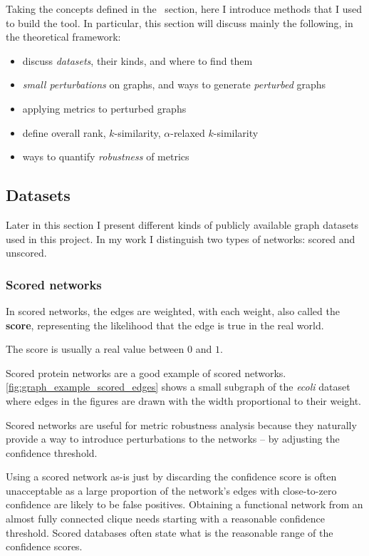 Taking the concepts defined in the~ section, here I introduce methods that I used to build the \graffs tool.
In particular, this section will discuss mainly the following, in the theoretical framework:
\begin{itemize}
    \item discuss \textsl{datasets}, their kinds, and where to find them
    \item \textsl{small perturbations} on graphs, and ways to generate \textsl{perturbed} graphs
    \item applying metrics to perturbed graphs
    \item define overall rank, $k$-similarity, $\alpha$-relaxed $k$-similarity
    \item ways to quantify \textsl{robustness} of metrics
\end{itemize}

\subsection{Datasets}

Later in this section I present different kinds of publicly available graph datasets used in this project.
In my work I distinguish two types of networks: scored and unscored.

\subsubsection{Scored networks}

In scored networks, the edges are weighted, with each weight, also called the \textbf{score}, representing the likelihood that the edge is true in the real world.

The score is usually a real value between $0$ and $1$.



Scored protein networks are a good example of scored networks.
\autoref{fig:graph_example_scored_edges} shows a small subgraph of the \textsl{ecoli} dataset where edges in the figures are drawn with the width proportional to their weight.

Scored networks are useful for metric robustness analysis because they naturally provide a way to introduce perturbations to the networks -- by adjusting the confidence threshold.

Using a scored network as-is just by discarding the confidence score is often unacceptable as a large proportion of the network's edges with close-to-zero confidence are likely to be false positives.
Obtaining a functional network from an almost fully connected clique needs starting with a reasonable confidence threshold.
Scored databases often state what is the reasonable range of the confidence scores.

